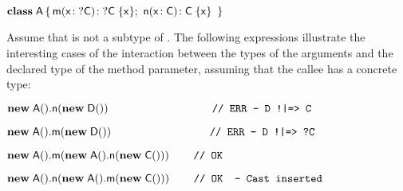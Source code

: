 \documentclass[acmlarge, anonymous, authordraft, review]{acmart} %
\begin{document}
\medskip
\(
 \Class \A {
    \Mdef \m\x{\dt\C} {\dt\C}  \x  ; \ 
    \Mdef \n\x\C\C  \x 
    }
\)
\medskip

\noindent Assume that \D is not a subtype of \C.  The following expressions illustrate the interesting cases of the interaction between the types of the arguments and the declared type of the method parameter, assuming that the callee has a concrete type:

\medskip
\( \Call {\New \A{}}\n {\New \D{} } \ \ \ \ \ \ \ \ \ \ \ \ \ \ \ \ \ \ \ \ \ \ \ \ \ \ \ \ \texttt{// ERR -- D !|=> C} \)

\( \Call {\New \A{}}\m {\New \D{}} \ \ \ \ \ \ \ \ \ \ \ \ \ \ \ \ \ \ \ \ \ \ \ \ \ \texttt{ // ERR -- D !|=> ?C }\)

\( \Call {\New \A{}} \m { \Call {\New \A {}} \n {\New \C{}} } \ \ \ \ \ \texttt{ // OK }\)

\( \Call {\New \A{}} \n { \Call {\New \A{}} \m {\New \C{}}} \ \ \ \ \ \texttt{ // OK \   -- Cast inserted} \)

\medskip
\end{document}
